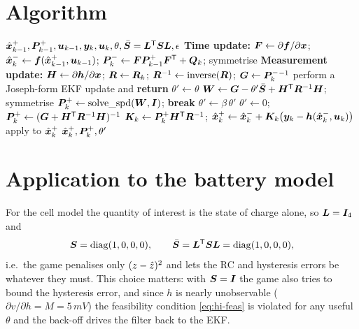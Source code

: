 \section{Algorithm}
\begin{algorithm}[H]
\caption{Hinf-EKF --- one sampling period}
\begin{algorithmic}[1]
\Require $\hat{\bm{x}}^{+}_{k-1},\bm{P}^{+}_{k-1},\bm{u}_{k-1},\bm{y}_k,\bm{u}_k,\theta,\bar{\bm{S}}=\bm{L}^{\mathsf{T}}\bm{S}\bm{L},\epsilon$
\State \textbf{Time update:} $\bm{F}\gets\partial\bm{f}/\partial\bm{x}$;\;
       $\hat{\bm{x}}^{-}_k\gets\bm{f}(\hat{\bm{x}}^{+}_{k-1},\bm{u}_{k-1})$;\;
       $\bm{P}^{-}_k\gets\bm{F}\bm{P}^{+}_{k-1}\bm{F}^{\mathsf{T}}+\bm{Q}_k$; symmetrise
\State \textbf{Measurement update:} $\bm{H}\gets\partial\bm{h}/\partial\bm{x}$;\;
       $\bm{R}\gets\bm{R}_k$;\; $\bm{R}^{-1}\gets\operatorname{inverse}(\bm{R})$;\;
       $\bm{G}\gets\bm{P}^{-}_k{}^{-1}$
 
  \State perform a Joseph-form EKF update and \textbf{return}
\EndIf
\State $\theta'\gets\theta$
  \State $\bm{W}\gets\bm{G}-\theta'\bar{\bm{S}}+\bm{H}^{\mathsf{T}}\bm{R}^{-1}\bm{H}$; symmetrise
     \State $\bm{P}^{+}_k\gets\operatorname{solve\_spd}(\bm{W},\bm{I})$; \textbf{break}
  \EndIf
  \State $\theta'\gets\beta\,\theta'$ 
\EndFor
{}
  \State $\theta'\gets0$;\; $\bm{P}^{+}_k\gets(\bm{G}+\bm{H}^{\mathsf{T}}\bm{R}^{-1}\bm{H})^{-1}$ 
\EndIf
\State $\bm{K}_k\gets\bm{P}^{+}_k\bm{H}^{\mathsf{T}}\bm{R}^{-1}$;\;
       $\hat{\bm{x}}^{+}_k\gets\hat{\bm{x}}^{-}_k+\bm{K}_k\big(\bm{y}_k-\bm{h}(\hat{\bm{x}}^{-}_k,\bm{u}_k)\big)$
\State apply  to $\hat{\bm{x}}^{+}_k$
\Ensure $\hat{\bm{x}}^{+}_k,\bm{P}^{+}_k,\theta'$
\end{algorithmic}
\end{algorithm}

\section{Application to the battery model}
For the cell model the quantity of interest is the state of charge alone, so $\bm{L}=\bm{I}_4$ and
\begin{equation}
\bm{S} = \operatorname{diag}(1,0,0,0),\qquad \bar{\bm{S}}=\bm{L}^{\mathsf{T}}\bm{S}\bm{L}=\operatorname{diag}(1,0,0,0),
\label{eq:hi-Sbat}
\end{equation}
i.e.\ the game penalises only $(z-\hat{z})^2$ and lets the RC and hysteresis errors be
whatever they must.  This choice matters: with $\bm{S}=\bm{I}$ the game also tries to bound the
hysteresis error, and since $h$ is nearly unobservable ($\partial v/\partial h = M =
5\,mV$) the feasibility condition \eqref{eq:hi-feas} is violated for any useful
$\theta$ and the back-off drives the filter back to the EKF.

